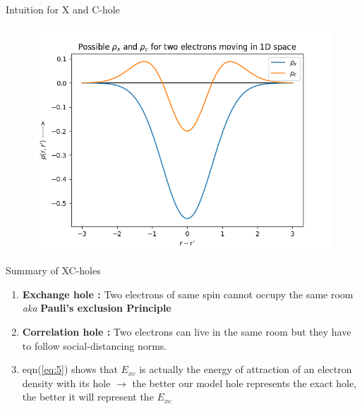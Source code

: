 \documentclass{beamer}
\begin{document}
	\begin{frame}[t]{Intuition for X and C-hole}
	\begin{figure}
	\centering
	\includegraphics[scale=0.65]{nx_nc.png}
	\end{figure}
	\end{frame}
	
	\begin{frame}[t]{Summary of XC-holes}
	\begin{enumerate}
	\item{\textbf{Exchange hole :} Two electrons of same spin cannot occupy the same room \textit{aka} \textbf{Pauli's exclusion Principle}}\\
	\vspace{0.5cm}
	\item{\textbf{Correlation hole :} Two electrons can live in the same room but they have to follow social-distancing norms.}\\
	\vspace{0.5cm}
	\item{eqn(\ref{eq:5}) shows that $E_{xc}$ is actually the energy of attraction of an electron density with its hole $\rightarrow$ the better our model hole represents the exact hole, the better it will represent the $E_{xc}$}
	\end{enumerate}
	\end{frame}
	
\end{document}
